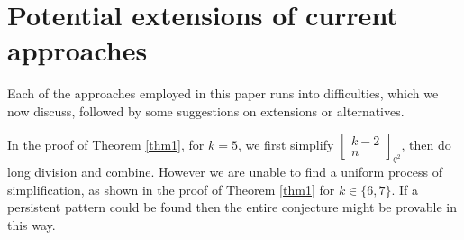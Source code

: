 \documentclass[12pt,reqno]{amsart}
\renewcommand{\(}{\left\(}
\renewcommand{\)}{\right\)}
\numberwithin{equation}{section}
\theoremstyle{plain}
\newtheorem{lemma}[theorem]{Lemma}
\theoremstyle{definition}
\numberwithin{equation}{section}
\begin{document}






\section{Potential extensions of current approaches}\label{conc}

Each of the approaches employed in this paper runs into difficulties, which we now discuss, followed by some suggestions on extensions or alternatives.

In the proof of Theorem \ref{thm1}, for $k=5$, we first simplify $[\begin{smallmatrix}k-2\\n\end{smallmatrix}]_{q^2}$, then do long division and combine. However we are unable to find a uniform process of simplification, as shown in the proof of Theorem \ref{thm1} for $k\in\{6,7\}$. If a persistent pattern could be found then the entire conjecture might be provable in this way.
\end{document}
